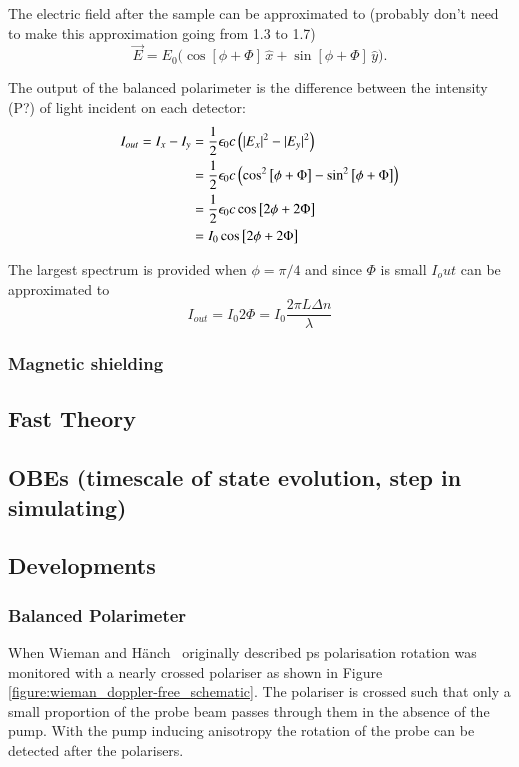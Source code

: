 The electric field after the sample can be approximated to {\color{red}(probably don't need to make this approximation going from 1.3 to 1.7)}
\begin{equation}
\vec{E} = E_0\big(\cos\left[\phi+\Phi\right]\,\hat{x}+\sin\left[\phi+\Phi\right]\,\hat{y}\big).
\end{equation}

The output of the balanced polarimeter is the difference between the intensity {\color{red}(P?)} of light incident on each detector:
\begin{align}
I_{out} = I_x - I_y &= \frac{1}{2}\epsilon_0 c \left(|E_x|^2 - |E_y|^2\right)\notag\\
&= \frac{1}{2}\epsilon_0 c \left(\cos^2\left[\phi+\Phi\right] - \sin^2\left[\phi+\Phi\right]\right)\notag\\
&= \frac{1}{2}\epsilon_0 c \cos\left[2\phi+2\Phi\right]\notag\\
&= I_0 \cos\left[2\phi+2\Phi\right]
\end{align}

The largest spectrum is provided when $\phi=\pi/4$ and since $\Phi$ is small $I_out$ can be approximated to
\begin{equation}
I_{out} = I_0 2\Phi = I_0 \frac{2\pi L \Delta n}{\lambda}
\end{equation}

\subsubsection{Magnetic shielding}

\subsection{Fast Theory}

\subsection{OBEs (timescale of state evolution, step in simulating)}

\subsection{Developments}

\subsubsection{Balanced Polarimeter}
When Wieman and H\"anch~\cite{wieman_doppler-free_1976} originally described \gls{ps} polarisation rotation was monitored with a nearly crossed polariser as shown in Figure \ref{figure:wieman_doppler-free_schematic}.
The polariser is crossed such that only a small proportion of the probe beam passes through them in the absence of the pump.
With the pump inducing anisotropy the rotation of the probe can be detected after the polarisers.

